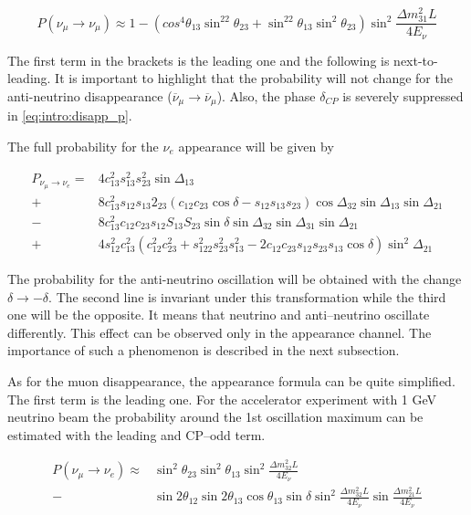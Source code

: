 \documentclass[../main.tex]{subfiles}
\begin{document}
\begin{equation}
\label{eq:intro:numu_simple}
P\left(\nu_\mu\to\nu_\mu\right)\approx1-\left(cos^4\theta_{13}\sin^22\theta_{23}+\sin^22\theta_{13}\sin^2\theta_{23}\right)\sin^2\frac{\Delta m^2_{31}L}{4E_\nu}
\end{equation}

The first term in the brackets is the leading one and the following is next-to-leading. It is important to highlight that the probability will not change for the anti-neutrino disappearance ($\overline{\nu}_\mu\to\overline{\nu}_\mu$). Also, the phase $\delta_{CP}$ is severely suppressed in \autoref{eq:intro:disapp_p}.

The full probability for the $\nu_e$ appearance will be given by

\begin{equation}
\begin{split}
P_{\nu_\mu\to\nu_e}= &4c_{13}^2s_{13}^2s_{23}^2\sin\Delta_{13} \\
+&8c_{13}^2s_{12}s_{13}2_{23}\left(c_{12}c_{23}\cos\delta-s_{12}s_{13}s_{23}\right)\cos\Delta_{32}\sin\Delta_{13}\sin\Delta_{21} \\
-&8c_{13}^2c_{12}c_{23}s_{12}S_{13}S_{23}\sin\delta\sin\Delta_{32}\sin\Delta_{31}\sin\Delta_{21} \\
+&4s_{12}^2c_{13}^2\left(c_{12}^2c^2_{23}+s^2_{122}s^2_{23}s^2_{13}-2c_{12}c_{23}s_{12}s_{23}s_{13}\cos\delta\right)\sin^2\Delta_{21}
\end{split}
\label{eq:intro:app_p}
\end{equation}

The probability for the anti-neutrino oscillation will be obtained with the change $\delta\to-\delta$. The second line is invariant under this transformation while the third one will be the opposite. It means that neutrino and anti--neutrino oscillate differently. This effect can be observed only in the appearance channel. The importance of such a phenomenon is described in the next subsection.

As for the muon disappearance, the appearance formula can be quite simplified. The first term is the leading one. For the accelerator experiment with 1 GeV neutrino beam the probability around the 1st oscillation maximum can be estimated with the leading and CP--odd term.

\begin{align}
\label{eq:intro:nue_simple}
P\left(\nu_\mu\to\nu_e\right)\approx&\sin^2\theta_{23}\sin^2\theta_{13}\sin^2\frac{\Delta m_{32}^2L}{4E_\nu} \\
-&\sin2\theta_{12}\sin2\theta_{13}\cos\theta_{13}\sin\delta\sin^2\frac{\Delta m_{32}^2L}{4E_\nu}\sin\frac{\Delta m_{21}^2L}{4E_\nu}
\end{align}
\end{document}

